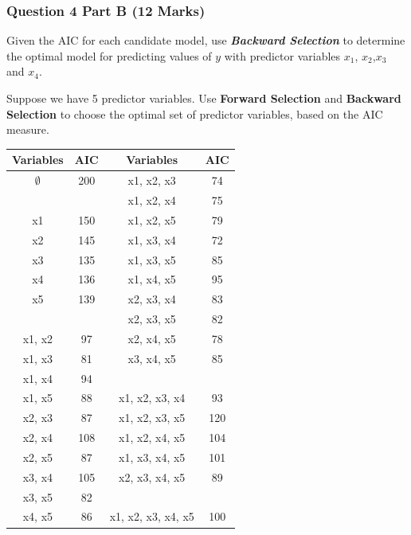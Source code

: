 \documentclass[a4paper,12pt]{article}
\begin{document}
\newpage

\subsubsection*{Question 4 Part B (12 Marks)}

Given the AIC for each candidate model, use \textbf{\textit{Backward Selection}} to determine the optimal model for predicting values of $y$ with predictor variables
$x_1$, $x_2$,$x_3$ and $x_4$.

Suppose we have 5 predictor variables.
Use \textbf{Forward Selection} and \textbf{Backward Selection} to choose the optimal set of predictor variables, based on the AIC measure.

{
	\large
	\begin{center}
		\begin{tabular}{||c|c||c|c||}
			\hline
			Variables & AIC & Variables & AIC \\ \hline \hline
			$\emptyset$	&	200	&	x1, x2, x3	&	74	\\ \hline
			\phantom{makemakespace}
			&	\phantom{makespace}
			&	x1, x2, x4	&	75	\\ \hline
			x1	&	150	&	x1, x2, x5	&	79	\\ \hline
			x2	&	145	&	x1, x3, x4	&	72	\\ \hline
			x3	&	135	&	x1, x3, x5	&	85	\\ \hline
			x4	&	136	&	x1, x4, x5	&	95	\\ \hline
			x5	&	139	&	x2, x3, x4	&	83	\\ \hline
			&		&	x2, x3, x5	&	82	\\ \hline
			x1, x2	&	97	&	x2, x4, x5	&	78	\\ \hline
			x1, x3	&	81	&	x3, x4, x5	&	85	\\ \hline
			x1, x4	&	94	&	\phantom{makemakespace}
			&	\phantom{makespace}
			\\ \hline
			x1, x5	&	88	&	x1, x2, x3, x4	&	93	\\ \hline
			x2, x3	&	87	&	x1, x2, x3, x5	&	120	\\ \hline
			x2, x4	&	108	&	x1, x2, x4, x5	&	104	\\ \hline
			x2, x5	&	87	&	x1, x3, x4, x5	&	101	\\ \hline
			x3, x4	&	105	&	x2, x3, x4, x5	&	89	\\ \hline
			x3, x5	&	82	&		&		\\ \hline
			x4, x5	&	86	&	x1, x2, x3, x4, x5	&	100	\\ \hline
		\end{tabular} 
	\end{center}
}
\newpage
\end{document}
